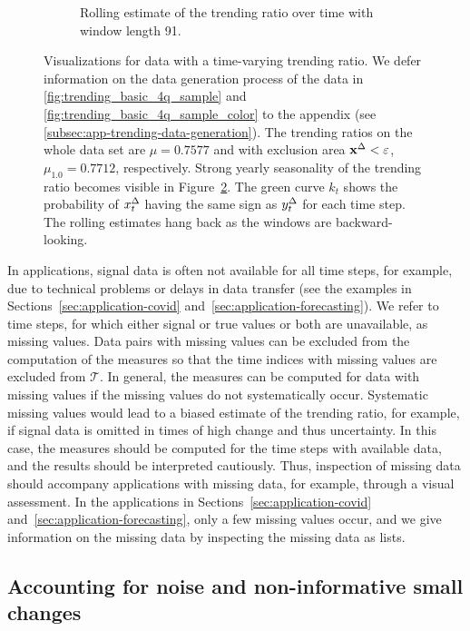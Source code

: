 \begin{figure}
\begin{subfigure}[t]{.48\textwidth}
    \caption{Rolling estimate of the trending ratio over time with window length 91. }\label{fig:trending_ratio_time_series}
    \end{subfigure}%
    \caption{Visualizations for data with a time-varying trending ratio. We defer information on the data generation process of the data in \ref{fig:trending_basic_4q_sample} and \ref{fig:trending_basic_4q_sample_color} to the appendix (see \ref{subsec:app-trending-data-generation}). The trending ratios on the whole data set are $\mu = 0.7577$ and with exclusion area $\mathbf{x}^{\Delta} < \varepsilon$, $\mu_{1.0} = 0.7712$, respectively. Strong yearly seasonality of the trending ratio becomes visible in Figure~\ref{fig:trending_ratio_time_series}. The green curve $k_t$ shows the probability of $x^{\Delta}_{t}$ having the same sign as $y^{\Delta}_{t}$ for each time step. The rolling estimates hang back as the windows are backward-looking.}
\end{figure}


In applications, signal data is often not available for all time steps, for example, due to technical problems or delays in data transfer (see the examples in Sections~\ref{sec:application-covid} and~\ref{sec:application-forecasting}).
We refer to time steps, for which either signal or true values or both are unavailable, as missing values.
Data pairs with missing values can be excluded from the computation of the measures so that the time indices with missing values are excluded from $\mathcal{T}$.
In general, the measures can be computed for data with missing values if the missing values do not systematically occur.
Systematic missing values would lead to a biased estimate of the trending ratio, for example, if signal data is omitted in times of high change and thus uncertainty.
In this case, the measures should be computed for the time steps with available data, and the results should be interpreted cautiously.
Thus, inspection of missing data should accompany applications with missing data, for example, through a visual assessment.
In the applications in Sections~\ref{sec:application-covid} and~\ref{sec:application-forecasting}, only a few missing values occur, and we give information on the missing data by inspecting the missing data as lists.

\subsection{Accounting for noise and non-informative small changes}\label{subsec:trending-noise}

